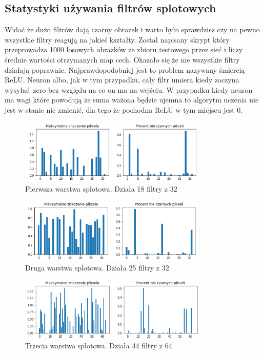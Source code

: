 \documentclass{article}
\begin{document}
\subsection{Statystyki używania filtrów splotowych}
Widać że dużo filtrów dają czarny obrazek i warto było sprawdzisz czy na pewno wszystkie filtry reagują na jakieś kształty. Został napisany skrypt który przeprowadza 1000 losowych obrazków ze zbioru testowego przez sieć i liczy średnie wartości otrzymanych map cech. Okazało się że nie wszystkie filtry działają poprawnie. Najprawdopodobniej jest to problem nazywany śmiercią ReLU. Neuron albo, jak w tym przypadku, cały filtr umiera kiedy zaczyna wysyłać zero bez względu na co on ma na wejściu. W przypadku kiedy neuron ma wagi które powodują że suma ważona będzie ujemna to algorytm uczenia nie jest w stanie nic zmienić, dla tego że pochodna ReLU w tym miejscu jest 0. \cite{geron}

\begin{figure}[H]
	\centering
	\includegraphics[width=0.8\textwidth,keepaspectratio=true]{statystyka_warstwy_1}
	\caption{Pierwsza warstwa splotowa. Działa 18 filtry z 32}
	\label{statystyka_warstwy_1}
\end{figure}

\begin{figure}[H]
	\centering
	\includegraphics[width=0.8\textwidth,keepaspectratio=true]{statystyka_warstwy_2}
	\caption{Druga warstwa splotowa. Działa 25 filtry z 32}
	\label{statystyka_warstwy_2}
\end{figure}

\begin{figure}[H]
	\centering
	\includegraphics[width=0.8\textwidth,keepaspectratio=true]{statystyka_warstwy_3}
	\caption{Trzecia warstwa splotowa. Działa 44 filtry z 64}
	\label{statystyka_warstwy_3}
\end{figure}
\end{document}
